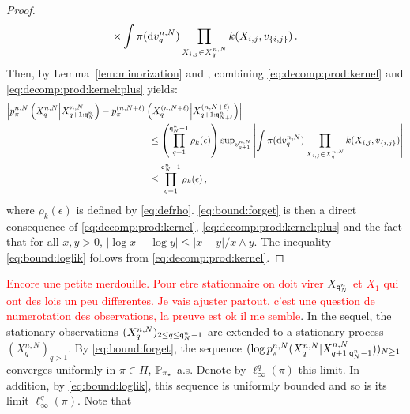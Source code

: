 \begin{proof}
\begin{multline}
\times\int \pi(\mathrm{d} v_q^{n,N})\prod_{X_{i,j}\in X_{q}^{n,N}}k(X_{i,j},v_{\{i,j\}})\,.
\end{multline}
Then, by Lemma~\ref{lem:minorization} and \cite{lindvall:1992}, combining \eqref{eq:decomp:prod:kernel} and \eqref{eq:decomp:prod:kernel:plus} yields:
\begin{align*}
\left|p_{\pi}^{n,N}\left(X_{q}^{n,N}\middle|X_{q+1:\ordermax{n}{N}}^{n,N}\right) -  p_{\pi}^{(n,N+\ell)}\left(X_{q}^{(n,N+\ell)}\middle|X_{q+1:\ordermax{n}{N+\ell}}^{(n,N+\ell)}\right) \right|&\\
&\hspace{-3.5cm}\leq \left(\prod_{q+1}^{\ordermax{n}{N}-1}\rho_k(\epsilon)\right) \sup_{v^{n,N}_{q+1}}\left|\int\pi(\rmd v^{n,N}_q)\prod_{X_{i,j}\in X_{q}^{n,N}}\condlik(X_{i,j},v_{\{i,j\}})\right|\\
&\hspace{-3.5cm}\le \prod_{q+1}^{\ordermax{n}{N}-1}\rho_k(\epsilon)\eqsp,
\end{align*}
where $\rho_k(\epsilon)$ is defined by \eqref{eq:defrho}. \eqref{eq:bound:forget} is then a direct consequence of \eqref{eq:decomp:prod:kernel}, \eqref{eq:decomp:prod:kernel:plus} and the fact that 
for all $x,y>0$, $|\log x - \log y| \le |x-y|/x\wedge y$.
The inequality \eqref{eq:bound:loglik} follows from \eqref{eq:decomp:prod:kernel}. 
\end{proof}
\textcolor{red}{Encore une petite merdouille. Pour etre stationnaire on doit virer $X_{{\mathsf{q}}^{n}_{N}}$ et $X_1$ qui ont des lois un peu differentes. Je vais ajuster partout, c'est une question de numerotation des observations, la preuve est ok il me semble}. In the sequel, the stationary observations $(X^{n,N}_{q})_{2\le q\le {\mathsf{q}}^{n}_{N}-1}$ are extended to a stationary process $(X^{n,N}_{q})_{ q>1}$. By \eqref{eq:bound:forget}, the sequence $(\log p_{\pi}^{n,N}(X_{q}^{n,N}|X_{q+1:{\mathsf{q}}^{n}_{N}-1}^{n,N}))_{N\ge 1}$ converges uniformly in $\pi\in\Pi$, $\mathbb{P}_{\pi_{\star}}$-a.s. Denote by $\ell^q_{\infty}(\pi)$ this limit. In addition, by \eqref{eq:bound:loglik}, this sequence is uniformly bounded and so is its limit $\ell^q_{\infty}(\pi)$. Note that
